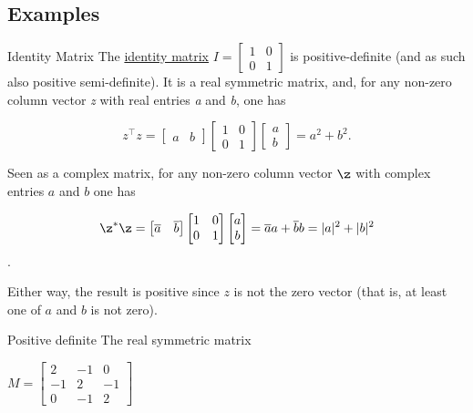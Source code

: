 {{{{{{{{{\hypertarget{examples}{%
\subsection{Examples}\label{examples}}
\begin{example}{Identity Matrix}
\label{pd-example}
The \href{identity_matrix}{identity matrix}
\(I = \begin{bmatrix} 1 & 0 \\ 0 & 1 \end{bmatrix}\) is
positive-definite (and as such also positive semi-definite). It is a
real symmetric matrix, and, for any non-zero column vector \emph{z} with
real entries \emph{a} and \emph{b}, one has

\[z^\top  z = \begin{bmatrix} a & b \end{bmatrix} \begin{bmatrix} 1 & 0 \\ 0 & 1 \end{bmatrix} \begin{bmatrix} a \\ b \end{bmatrix} = a^2 + b^2.\]

Seen as a complex matrix, for any non-zero column vector $\z$ with
complex entries $a$ and $b$ one has

\[\z^*\z = \begin{bmatrix} \overline{a} & \overline{b} \end{bmatrix} \begin{bmatrix} 1 & 0 \\ 0 & 1 \end{bmatrix} \begin{bmatrix} a \\ b\end{bmatrix} = \overline{a}a + \overline{b}b = |a|^2 + |b|^2\].

Either way, the result is positive since \(z\) is not the zero vector
(that is, at least one of \(a\) and \(b\) is not zero). 
\end{example}

\begin{example}{Positive definite}
 The real symmetric matrix
\begin{description}
\item
\(M = \begin{bmatrix} 2 & -1 & 0 \\ -1 & 2 & -1 \\ 0 & -1 & 2 \end{bmatrix}\)
\end{description}


\end{example}}}}}}}}}}
